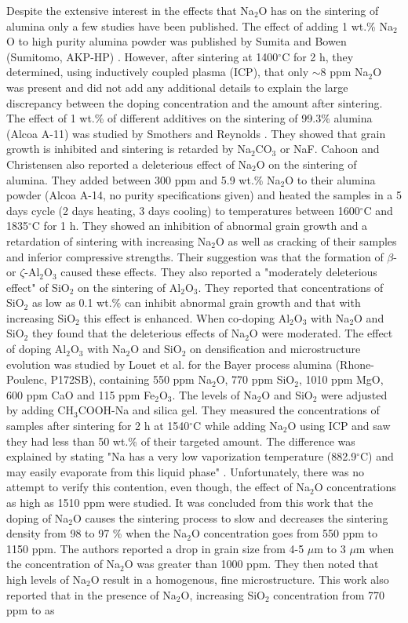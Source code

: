 Despite the extensive interest in the effects that Na$_{2}$O has on the sintering of alumina only a few studies have been published. The effect of adding 1 wt.\% Na$_{2}$O to high purity alumina powder was published by Sumita and Bowen (Sumitomo, AKP-HP) \cite{Sumita1988}. However, after sintering at 1400$^{\circ}$C for 2 h, they determined, using inductively coupled plasma (ICP), that only $\sim$8 ppm Na$_{2}$O was present and did not add any additional details to explain the large discrepancy between the doping concentration and the amount after sintering. The effect of 1 wt.\% of different additives on the sintering of 99.3\% alumina (Alcoa A-11) was studied by Smothers and Reynolds \cite{Smothers1954}. They showed that grain growth is inhibited and sintering is retarded by Na$_{2}$CO$_{3}$ or NaF. Cahoon and Christensen \cite{Cahoon1956} also reported a deleterious effect of Na$_{2}$O on the sintering of alumina. They added between 300 ppm and 5.9 wt.\% Na$_{2}$O to their alumina powder (Alcoa A-14, no purity specifications given) and heated the samples in a 5 days cycle (2 days heating, 3 days cooling) to temperatures between 1600$^{\circ}$C and 1835$^{\circ}$C for 1 h. They showed an inhibition of abnormal grain growth and a retardation of sintering with increasing Na$_{2}$O as well as cracking of their samples and inferior compressive strengths. Their suggestion was that the formation of $\beta$- or $\zeta$-Al$_{2}$O$_{3}$ caused these effects. They also reported a "moderately deleterious effect" of SiO$_{2}$ on the sintering of Al$_{2}$O$_{3}$. They reported that concentrations of SiO$_{2}$ as low as 0.1 wt.\% can inhibit abnormal grain growth and that with increasing SiO$_{2}$ this effect is enhanced. When co-doping Al$_{2}$O$_{3}$ with Na$_{2}$O and SiO$_{2}$ they found that the deleterious effects of Na$_{2}$O were moderated. The effect of doping Al$_{2}$O$_{3}$ with Na$_{2}$O and SiO$_{2}$ on densification and microstructure evolution was studied by Louet et al. \cite{Louet2005a} for the Bayer process alumina (Rhone-Poulenc, P172SB), containing 550 ppm Na$_{2}$O, 770 ppm SiO$_{2}$, 1010 ppm MgO, 600 ppm CaO and 115 ppm Fe$_{2}$O$_{3}$. The levels of Na$_{2}$O and SiO$_{2}$ were adjusted by adding CH$_{3}$COOH-Na and silica gel. They measured the concentrations of samples after sintering for 2 h at 1540$^{\circ}$C while adding Na$_{2}$O using ICP and saw they had less than 50 wt.\% of their targeted amount. The difference was explained by stating "Na has a very low vaporization temperature (882.9$^{\circ}$C) and may easily evaporate from this liquid phase" \cite{Louet2005a}. Unfortunately, there was no attempt to verify this contention, even though, the effect of Na$_{2}$O concentrations as high as 1510 ppm were studied. It was concluded from this work that the doping of Na$_{2}$O causes the sintering process to slow and decreases the sintering density from 98 to 97 \% when the Na$_{2}$O concentration goes from 550 ppm to 1150 ppm. The authors reported a drop in grain size from 4-5 $\mu$m to 3 $\mu$m when the concentration of Na$_{2}$O was greater than 1000 ppm. They then noted that high levels of Na$_{2}$O result in a homogenous, fine microstructure. This work also reported that in the presence of Na$_{2}$O, increasing SiO$_{2}$ concentration from 770 ppm to as 